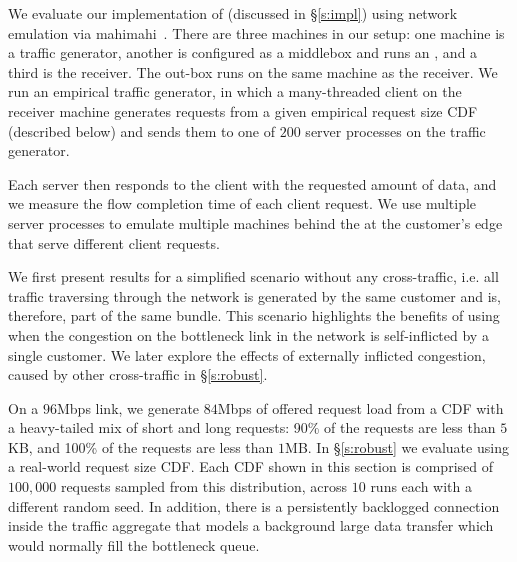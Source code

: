 

We evaluate our implementation of \name (discussed in \S\ref{s:impl}) using network emulation via mahimahi~\cite{mahimahi}.
There are three machines in our setup: one machine is a traffic generator, another is configured as a middlebox and runs an \inbox, and a third is the receiver. 
The out-box runs on the same machine as the receiver.
We run an empirical traffic generator, in which a many-threaded client on the receiver machine  generates requests from a given empirical request size CDF (described below) and sends them to one of $200$ server processes on the traffic generator.
 
Each server then responds to the client with the requested amount of data, and
we measure the flow completion time of each client request.
We use multiple server processes to emulate multiple machines behind the \name at the customer's edge that serve different client requests.
%

We first present results for a simplified scenario without any cross-traffic, i.e. all traffic traversing through the network is generated by the same customer and is, therefore, part of the same bundle. 
This scenario highlights the benefits of using \name when the congestion on the bottleneck link in the network is self-inflicted by a single customer. We later explore the effects of externally inflicted congestion, caused by other cross-traffic in \S\ref{s:robust}.

On a $96$Mbps link, we generate $84$Mbps of offered request load from a CDF with a heavy-tailed mix of short and long requests: 90\% of the requests are less than $5$KB, and 100\% of the requests are less than $1$MB.
In \S\ref{s:robust} we evaluate \name using a real-world request size CDF. 
Each CDF shown in this section is comprised of $100,000$ requests sampled from this distribution, across $10$ runs each with a different random seed.
In addition, there is a persistently backlogged connection inside the traffic aggregate that models a background large data transfer which would normally fill the bottleneck queue.

